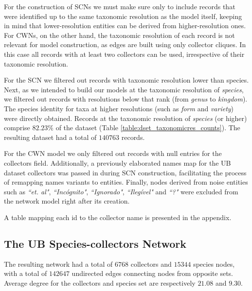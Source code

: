 For the construction of SCNs we must make sure only to include records that were identified up to the same taxonomic resolution as the model itself, keeping in mind that lower-resolution entities can be derived from higher-resolution ones. 
For CWNs, on the other hand, the taxonomic resolution of each record is not relevant for model construction, as edges are built using only collector cliques. In this case all records with at least two collectors can be used, irrespective of their taxonomic resolution.

For the SCN we filtered out records with taxonomic resolution lower than species.
Next, as we intended to build our models at the taxonomic resolution of \textit{species}, we filtered out records with resolutions below that rank (from \textit{genus} to \textit{kingdom}). 
The species identity for taxa at higher resolutions (such as \textit{form} and \textit{variety}) were directly obtained. 
Records at the taxonomic resolution of \textit{species} (or higher) comprise $82.23\%$ of the dataset (Table \ref{table:dset_taxonomicres_counts}).
The resulting dataset had a total of $140763$ records. 

For the CWN model we only filtered out records with null entries for the collectors field.
Additionally, a previously elaborated names map for the UB dataset collectors was passed in during SCN construction, facilitating the process of remapping names variants to entities. 
Finally, nodes derived from noise entities such as \textit{``et. al"}, \textit{``Incógnito"}, \textit{``Ignorado"}, \textit{``Ilegível"} and \textit{``?"} were excluded from the network model right after its creation.

A table mapping each id to the collector name is presented in the appendix.



\subsection{The UB Species-collectors Network} \label{section:ub_scn}

The resulting network had a total of $6768$ collectors and $15344$ species nodes, with a total of $142647$ undirected edges connecting nodes from opposite sets. 
Average degree for the collectors and species set are respectively $21.08$ and $9.30$.

